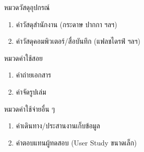 \noindent หมวดวัสดุอุปกรณ์

\begin{enumerate}[label=(\arabic*), leftmargin=2\firstindentlength, topsep=0pt, itemsep=0pt]
    \item ค่าวัสดุสำนักงาน (กระดาษ ปากกา ฯลฯ)
    \item ค่าวัสดุคอมพิวเตอร์/สื่อบันทึก (แฟลชไดรฟ์ ฯลฯ)
\end{enumerate}

\noindent หมวดค่าใช้สอย

\begin{enumerate}[label=(\arabic*), leftmargin=2\firstindentlength, topsep=0pt, itemsep=0pt]
    \item ค่าถ่ายเอกสาร
    \item ค่าจัดรูปเล่ม
\end{enumerate}

\noindent หมวดค่าใช้จ่ายอื่น ๆ

\begin{enumerate}[label=(\arabic*), leftmargin=2\firstindentlength, topsep=0pt, itemsep=0pt]
    \item ค่าเดินทาง/ประสานงานเก็บข้อมูล
    \item ค่าตอบแทนผู้ทดสอบ (User Study ขนาดเล็ก)
\end{enumerate}
